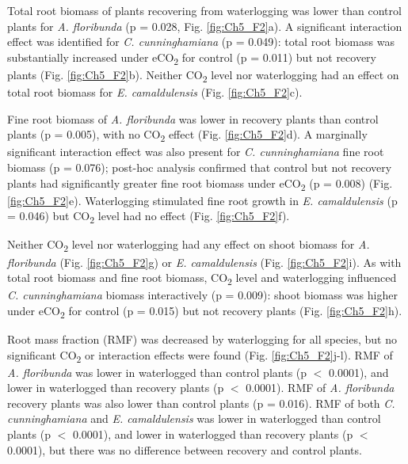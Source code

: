 \documentclass[12pt,a4paper]{memoir}
\begin{document}
Total root biomass of plants recovering from waterlogging was lower than control plants for \textit{A. floribunda} (p = 0.028, Fig. \ref{fig:Ch5_F2}a). A significant interaction effect was identified for \textit{C. cunninghamiana} (p = 0.049): total root biomass was substantially increased under eCO\textsubscript{2} for control (p = 0.011) but not recovery plants (Fig. \ref{fig:Ch5_F2}b). Neither CO\textsubscript{2} level nor waterlogging had an effect on total root biomass for \textit{E. camaldulensis} (Fig. \ref{fig:Ch5_F2}c). 

Fine root biomass of \textit{A. floribunda} was lower in recovery plants than control plants (p = 0.005), with no CO\textsubscript{2} effect (Fig. \ref{fig:Ch5_F2}d). A marginally significant interaction effect was also present for \textit{C. cunninghamiana} fine root biomass (p = 0.076); post-hoc analysis confirmed that control but not recovery plants had significantly greater fine root biomass under eCO\textsubscript{2} (p = 0.008) (Fig. \ref{fig:Ch5_F2}e). Waterlogging stimulated fine root growth in \textit{E. camaldulensis} (p = 0.046) but CO\textsubscript{2} level had no effect (Fig. \ref{fig:Ch5_F2}f).

Neither CO\textsubscript{2} level nor waterlogging had any effect on shoot biomass for \textit{A. floribunda} (Fig. \ref{fig:Ch5_F2}g) or \textit{E. camaldulensis} (Fig. \ref{fig:Ch5_F2}i). As with total root biomass and fine root biomass, CO\textsubscript{2} level and waterlogging influenced \textit{C. cunninghamiana} biomass interactively (p = 0.009): shoot biomass was higher under eCO\textsubscript{2} for control (p = 0.015) but not recovery plants (Fig. \ref{fig:Ch5_F2}h).

Root mass fraction (RMF) was decreased by waterlogging for all species, but no significant CO\textsubscript{2} or interaction effects were found (Fig. \ref{fig:Ch5_F2}j-l). RMF of \textit{A. floribunda} was lower in waterlogged than control plants (p $<$ 0.0001), and lower in waterlogged than recovery plants (p $<$ 0.0001). RMF of \textit{A. floribunda} recovery plants was also lower than control plants (p = 0.016). RMF of both \textit{C. cunninghamiana} and \textit{E. camaldulensis} was lower in waterlogged than control plants (p $<$ 0.0001), and lower in waterlogged than recovery plants (p $<$ 0.0001), but there was no difference between recovery and control plants.
\end{document}
